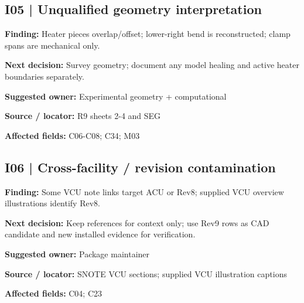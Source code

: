 \documentclass[11pt]{article}
\begin{document}
\par\noindent\begin{minipage}{\textwidth}\small\setlength{\parskip}{2pt}
\subsection*{I05 | Unqualified geometry interpretation}
\textbf{Finding:} Heater pieces overlap/offset; lower-right bend is reconstructed; clamp spans are mechanical only.\par
\textbf{Next decision:} Survey geometry; document any model healing and active heater boundaries separately.\par
\textbf{Suggested owner:} Experimental geometry + computational\par
\textbf{Source / locator:} R9 sheets 2-4 and SEG\par
\textbf{Affected fields:} C06-C08; C34; M03\par
\end{minipage}\par\vspace{8pt}
\par\noindent\begin{minipage}{\textwidth}\small\setlength{\parskip}{2pt}
\subsection*{I06 | Cross-facility / revision contamination}
\textbf{Finding:} Some VCU note links target ACU or Rev8; supplied VCU overview illustrations identify Rev8.\par
\textbf{Next decision:} Keep references for context only; use Rev9 rows as CAD candidate and new installed evidence for verification.\par
\textbf{Suggested owner:} Package maintainer\par
\textbf{Source / locator:} SNOTE VCU sections; supplied VCU illustration captions\par
\textbf{Affected fields:} C04; C23\par
\end{minipage}\par\vspace{8pt}
\end{document}
